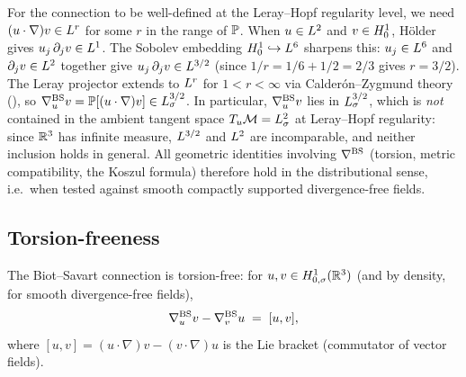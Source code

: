 \begin{remark}\label{rem:conn-regularity}
  For the connection to be well-defined at the Leray--Hopf regularity level, we need
  $(u \cdot \nabla)v \in L^{r}$ for some $r$ in the range of $\mathbb{P}$.  When
  $u \in L^{2}$ and $v \in H^{1}_0$, H\"{o}lder gives
  $u_j\,\partial_j v \in L^{1}$.  The Sobolev embedding $H^{1}_0 \hookrightarrow L^{6}$
  sharpens this: $u_j \in L^{6}$ and $\partial_j v \in L^{2}$ together give
  $u_j\,\partial_j v \in L^{3/2}$ (since $1/r = 1/6 + 1/2 = 2/3$ gives $r = 3/2$).
  The Leray projector extends to $L^{r}$ for $1 < r < \infty$ via
  Calder\'{o}n--Zygmund theory (), so $\nabla^{\mathrm{BS}}_u v = \mathbb{P}[(u\cdot\nabla)v]
  \in L^{3/2}_\sigma$.  In particular, $\nabla^{\mathrm{BS}}_u v$ lies in $L^{3/2}_\sigma$, which
  is \emph{not} contained in the ambient tangent space $T_u\mathcal{M} = L^{2}_\sigma$
  at Leray--Hopf regularity: since $\mathbb{R}^3$ has infinite measure, $L^{3/2}$ and $L^{2}$
  are incomparable, and neither inclusion holds in general.  All geometric identities involving $\nabla^{\mathrm{BS}}$
  (torsion, metric compatibility, the Koszul formula) therefore hold in the distributional
  sense, i.e.\ when tested against smooth compactly supported divergence-free fields.
\end{remark}

\subsection{Torsion-freeness}

\begin{proposition}\label{prop:torsion-free}
  The Biot--Savart connection is torsion-free: for
  $u, v \in H^1_{0,\sigma}(\mathbb{R}^3)$ (and by density, for smooth divergence-free
  fields),
  \begin{equation}\label{eq:torsion-free}
    \nabla^{\mathrm{BS}}_u v - \nabla^{\mathrm{BS}}_v u \;=\; [u, v],
  \end{equation}
  where $[u,v] = (u \cdot \nabla)v - (v \cdot \nabla)u$ is the Lie bracket
  (commutator of vector fields).
\end{proposition}

